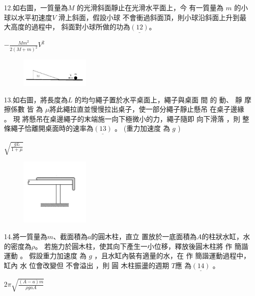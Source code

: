 \documentclass[cn,10pt,math=newtx,chinesefont=founder,device=ig]{elegantbook}
\begin{document}
\begin{example}
   12.如右圖，一質量為$ M$ 的光滑斜面靜止在光滑水平面上，今
有一質量為 $m$ 的小球以水平初速度$V$ 滑上斜面，假設小球
不會衝過斜面頂，則小球沿斜面上升到最大高度的過程中，
斜面對小球所做的功為$\underline{(12)}$。\\
    \rightline{[文華高中教甄109]}
\end{example}
\begin{solution}
    $- \frac{Mm^2}{2(M+m)^2} V^2$
\end{solution}
\begin{figure}[htbp]
    \flushright
    \includegraphics[width=0.3\textwidth]{image/109文華12.png}
  \end{figure}
\newpage


\begin{example}
  13.如右圖，將長度為$L$ 的均勻繩子置於水平桌面上，繩子與桌面 間 的 動、
靜 摩擦係數 皆 為 $\mu$將此繩拉直並慢慢拉出桌子，使一部分繩子靜止懸吊
在桌子邊緣 。 現 將懸吊在桌邊繩子的末端施一向下極微小的力，繩子隨即
向下滑落 ，則 整條繩子恰離開桌面時的速率為$\underline{(13)}$ 。 (重力加速度
為 $g$ ) \\
    \rightline{[文華高中教甄109]}
\end{example}
\begin{solution}
    $\sqrt{\frac{gL} {1+\mu}}$
\end{solution}
\begin{figure}[htbp]
    \flushright
    \includegraphics[width=0.3\textwidth]{image/109文華13.png}
  \end{figure}
\newpage


\begin{example}
   14.將一質量為$m$、截面積為$a$的圓木柱，直立 置放於一底面積為$A$的柱狀水缸，水的密度為$\rho$。
若施力於圓木柱，使其向下產生一小位移，釋放後圓木柱將 作 簡諧運動 。 假設重力加速度
為 $g$ ，且水缸內裝有適量的水，在 作 簡諧運動過程中， 缸內 水 位會改變但 不會溢出 ，則 圓
木柱振盪的週期 $T$應 為$\underline{(14)}$ 。\\
    \rightline{[文華高中教甄109]}
\end{example}
\begin{solution}
    $2\pi \sqrt{\frac{(A-a)m}{\rho gaA}}$ 
\end{solution}
\end{document}
